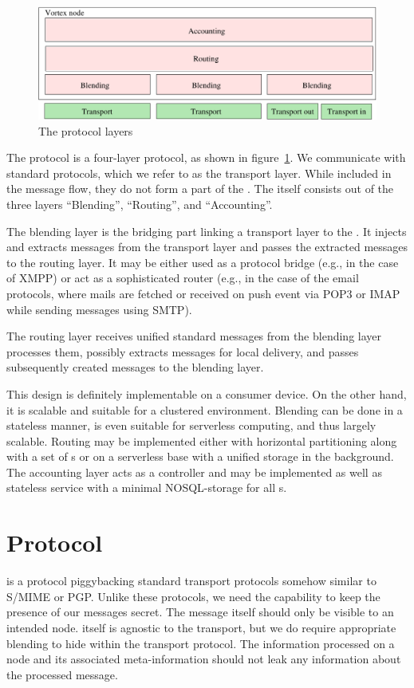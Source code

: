 \begin{figure}[ht]
	\includegraphics[width=\textwidth]{inc/layerDesign}
	\caption{The protocol layers}
	\label{fig:protocolLayers}
\end{figure}

The protocol is a four-layer protocol, as shown in figure~\ref{fig:protocolLayers}. We communicate with standard protocols, which we refer to as the transport layer. While included in the message flow, they do not form a part of the \VortexNode. The \VortexNode{} itself consists out of the three layers ``Blending'', ``Routing'', and ``Accounting''.

The blending layer is the bridging part linking a transport layer to the \VortexNode{}. It injects and extracts messages from the transport layer and passes the extracted messages to the routing layer. It may be either used as a protocol bridge (e.g., in the case of XMPP) or act as a sophisticated router (e.g., in the case of the email protocols, where mails are fetched or received on push event via POP3 or IMAP while sending messages using SMTP).

The routing layer receives unified standard messages from the blending layer processes them, possibly extracts messages for local delivery, and passes subsequently created messages to the blending layer.

This design is definitely implementable on a consumer device. On the other hand, it is scalable and suitable for a clustered environment. Blending can be done in a stateless manner, is even suitable for serverless computing, and thus largely scalable. Routing may be implemented either with horizontal partitioning along with a set of s or on a serverless base with a unified storage in the background. The accounting layer acts as a controller and may be implemented as well as stateless service with a minimal NOSQL-storage for all s. 

\chapter{Protocol}\label{sec:protocol}
\MessageVortex{} is a protocol piggybacking standard transport protocols somehow similar to S/MIME\cite{rfc2015} or PGP\cite{PGP}. Unlike these protocols, we need the capability to keep the presence of our messages secret.  The message itself should only be visible to an intended node.\MessageVortex{} itself is agnostic to the transport, but we do require appropriate blending to hide within the transport protocol. The information processed on a node and its associated meta-information should not leak any information about the processed message. 

